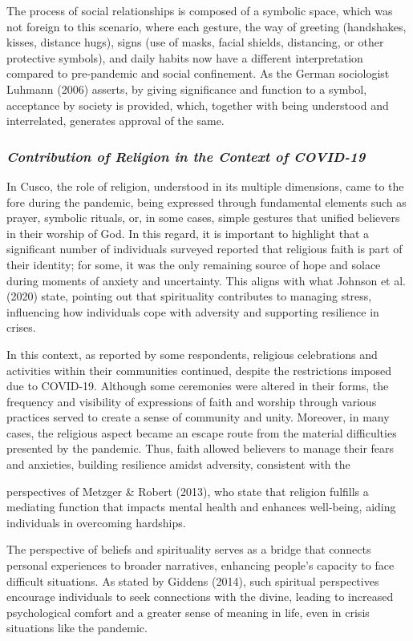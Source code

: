 \documentclass{article}
\begin{document}
The process of social relationships is composed of a symbolic space, which was not foreign to this scenario, where each gesture, the way of greeting (handshakes, kisses, distance hugs), signs (use of masks, facial shields, distancing, or other protective symbols), and daily habits now have a different interpretation compared to pre-pandemic and social confinement. As the German sociologist Luhmann (2006) asserts, by giving significance and function to a symbol, acceptance by society is provided, which, together with being understood and interrelated, generates approval of the same.

\subsubsection{\textit{Contribution of Religion in the Context of COVID-19}}

In Cusco, the role of religion, understood in its multiple dimensions, came to the fore during the pandemic, being expressed through fundamental elements such as prayer, symbolic rituals, or, in some cases, simple gestures that unified believers in their worship of God. In this regard, it is important to highlight that a significant number of individuals surveyed reported that religious faith is part of their identity; for some, it was the only remaining source of hope and solace during moments of anxiety and uncertainty. This aligns with what Johnson et al. (2020) state, pointing out that spirituality contributes to managing stress, influencing how individuals cope with adversity and supporting resilience in crises.

In this context, as reported by some respondents, religious celebrations and activities within their communities continued, despite the restrictions imposed due to COVID-19. Although some ceremonies were altered in their forms, the frequency and visibility of expressions of faith and worship through various practices served to create a sense of community and unity. Moreover, in many cases, the religious aspect became an escape route from the material difficulties presented by the pandemic. Thus, faith allowed believers to manage their fears and anxieties, building resilience amidst adversity, consistent with the

perspectives of Metzger \& Robert (2013), who state that religion fulfills a mediating function that impacts mental health and enhances well-being, aiding individuals in overcoming hardships.

The perspective of beliefs and spirituality serves as a bridge that connects personal experiences to broader narratives, enhancing people's capacity to face difficult situations. As stated by Giddens (2014), such spiritual perspectives encourage individuals to seek connections with the divine, leading to increased psychological comfort and a greater sense of meaning in life, even in crisis situations like the pandemic.
\end{document}
